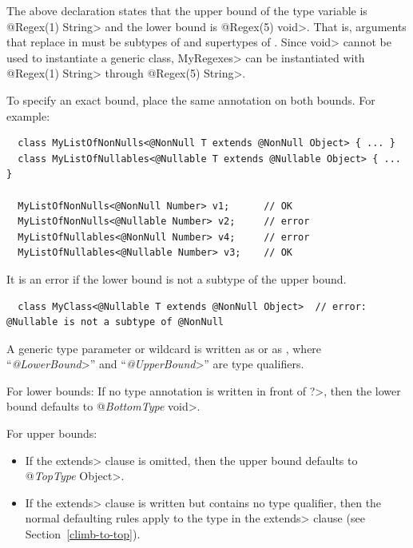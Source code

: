 The above declaration states that the upper bound of the type variable
is \<@Regex(1) String> and the lower bound is \<@Regex(5) void>.  That is,
arguments that replace  in  must be subtypes of
 and supertypes of .
Since \<void> cannot be used to instantiate a generic class, \<MyRegexes> can
be instantiated with \<@Regex(1) String> through \<@Regex(5) String>.


To specify an exact bound, place the same annotation on both bounds.  For example:

\begin{Verbatim}
  class MyListOfNonNulls<@NonNull T extends @NonNull Object> { ... }
  class MyListOfNullables<@Nullable T extends @Nullable Object> { ... }

  MyListOfNonNulls<@NonNull Number> v1;      // OK
  MyListOfNonNulls<@Nullable Number> v2;     // error
  MyListOfNullables<@NonNull Number> v4;     // error
  MyListOfNullables<@Nullable Number> v3;    // OK
\end{Verbatim}

It is an error if the lower bound is not a subtype of the upper bound.

\begin{smaller}
\begin{Verbatim}
  class MyClass<@Nullable T extends @NonNull Object>  // error: @Nullable is not a subtype of @NonNull
\end{Verbatim}
\end{smaller}



A generic type parameter or wildcard is written as  or as
, where
``\<\emph{@LowerBound}>'' and ``\<\emph{@UpperBound}>'' are type qualifiers.

For lower bounds:
If no type annotation is written in front of \<?>,
then the lower bound defaults to \<@\emph{BottomType} void>.

For upper bounds:
\begin{itemize}
\item
If the \<extends> clause is omitted,
then the upper bound defaults to \<@\emph{TopType} Object>.
\item
If the \<extends> clause is written but contains no type qualifier,
then the normal defaulting rules apply to the type in the \<extends>
clause (see Section~\ref{climb-to-top}).
\end{itemize}

